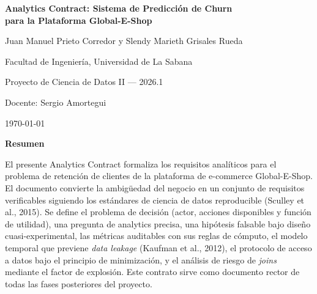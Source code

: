 \documentclass[12pt,a4paper]{article}
\begin{document}
\thispagestyle{fancy}
\begin{center}
\vspace*{2cm}
{\large\bfseries Analytics Contract: Sistema de Predicción de Churn\\[0.5em]
para la Plataforma Global-E-Shop}

\vspace{2em}

Juan Manuel Prieto Corredor y Slendy Marieth Grisales Rueda

\vspace{0.5em}

Facultad de Ingeniería, Universidad de La Sabana

\vspace{0.5em}

Proyecto de Ciencia de Datos II --- 2026.1

\vspace{0.5em}

Docente: Sergio Amortegui

\vspace{0.5em}

\today
\end{center}

\newpage

\begin{center}
{\bfseries Resumen}
\end{center}

El presente Analytics Contract formaliza los requisitos analíticos para el problema de retención de clientes de la plataforma de e-commerce Global-E-Shop. El documento convierte la ambigüedad del negocio en un conjunto de requisitos verificables siguiendo los estándares de ciencia de datos reproducible (Sculley et al., 2015). Se define el problema de decisión (actor, acciones disponibles y función de utilidad), una pregunta de analytics precisa, una hipótesis falsable bajo diseño cuasi-experimental, las métricas auditables con sus reglas de cómputo, el modelo temporal que previene \textit{data leakage} (Kaufman et al., 2012), el protocolo de acceso a datos bajo el principio de minimización, y el análisis de riesgo de \textit{joins} mediante el factor de explosión. Este contrato sirve como documento rector de todas las fases posteriores del proyecto.
\end{document}
